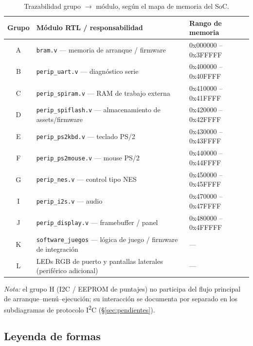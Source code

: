 \documentclass[11pt,a4paper]{article}
\begin{document}
\begin{table}[h]
\centering
\small
\begin{tabular}{@{}cll@{}}
\toprule
\textbf{Grupo} & \textbf{M\'odulo RTL / responsabilidad} & \textbf{Rango de memoria} \\
\midrule
A & \texttt{bram.v} --- memoria de arranque / firmware & 0x000000 -- 0x3FFFFF \\
B & \texttt{perip\_uart.v} --- diagn\'ostico serie & 0x400000 -- 0x40FFFF \\
C & \texttt{perip\_spiram.v} --- RAM de trabajo externa & 0x410000 -- 0x41FFFF \\
D & \texttt{perip\_spiflash.v} --- almacenamiento de assets/firmware & 0x420000 -- 0x42FFFF \\
E & \texttt{perip\_ps2kbd.v} --- teclado PS/2 & 0x430000 -- 0x43FFFF \\
F & \texttt{perip\_ps2mouse.v} --- mouse PS/2 & 0x440000 -- 0x44FFFF \\
G & \texttt{perip\_nes.v} --- control tipo NES & 0x450000 -- 0x45FFFF \\
I & \texttt{perip\_i2s.v} --- audio & 0x470000 -- 0x47FFFF \\
J & \texttt{perip\_display.v} --- framebuffer / panel & 0x480000 -- 0x4FFFFF \\
K & \texttt{software\_juegos} --- l\'ogica de juego / firmware de integraci\'on & --- \\
L & LEDs RGB de puerto y pantallas laterales (perif\'erico adicional) & --- \\
\bottomrule
\end{tabular}
\caption{Trazabilidad grupo $\rightarrow$ m\'odulo, seg\'un el mapa de memoria del SoC.}
\end{table}

\noindent\textit{Nota:} el grupo H (I2C / EEPROM de puntajes) no participa del flujo
principal de arranque--men\'u--ejecuci\'on; su interacci\'on se documenta por separado
en los subdiagramas de protocolo I\textsuperscript{2}C (\S\ref{sec:pendientes}).

\subsection{Leyenda de formas}
\begin{center}
\end{center}
\end{document}
